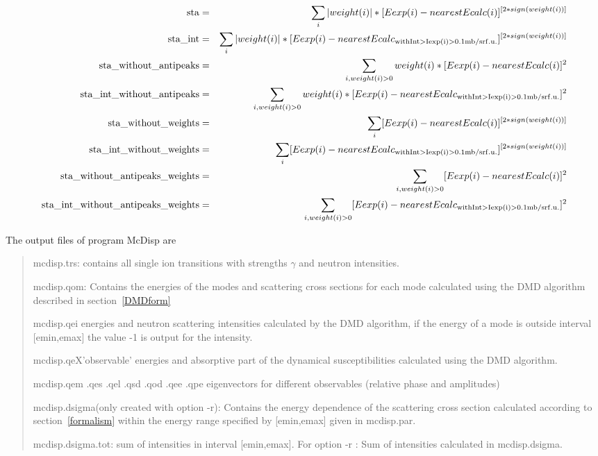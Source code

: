 \begin{eqnarray}
{\rm sta}                              & =& \sum_i |weight(i)|*[Eexp(i) - nearestEcalc(i)]^{[2*sign(weight(i))]}\\
{\rm sta\_int   }                       & = &\sum_i |weight(i)|*[Eexp(i) - nearestEcalc_{\rm with %
Int>Iexp(i)>0.1mb/srf.u.}]^{[2*sign(weight(i))]}\\
{\rm sta\_without\_antipeaks }           & =& \sum_{i, weight(i)>0}  weight(i)*[Eexp(i) - nearestEcalc(i)]^2\\
{\rm sta\_int\_without\_antipeaks }       & =&\sum_{i,weight(i)>0}  weight(i)*[Eexp(i) - nearestEcalc_{\rm with %
Int>Iexp(i)>0.1mb/srf.u.}]^2\\
{\rm sta\_without\_weights }              &=& \sum_i [Eexp(i) - nearestEcalc(i)]^{[2*sign(weight(i))]}\\
{\rm sta\_int\_without\_weights}          & =&\sum_i [Eexp(i) - nearestEcalc_{\rm with %
Int>Iexp(i)>0.1mb/srf.u.}]^{[2*sign(weight(i))]}\\
{\rm sta\_without\_antipeaks\_weights}    & = &\sum_{i, weight(i)>0}[Eexp(i) - nearestEcalc(i)]^2\\
{\rm sta\_int\_without\_antipeaks\_weights}& =& \sum_{i, weight(i)>0} [Eexp(i) - nearestEcalc_{\rm with %
Int>Iexp(i)>0.1mb/srf.u.}]^2\\
\end{eqnarray}



The output files of program {\prg McDisp} are 

\begin{quote}
\item[{\prg mcdisp.trs}:] contains all single ion transitions with strengths $\gamma$ 
and neutron intensities.
\item [{\prg mcdisp.qom}:] Contains the energies of the modes and scattering cross sections  for each mode 
calculated using the DMD algorithm described in section~\ref{DMDform}
\item[{\prg mcdisp.qei}] energies and neutron scattering intensities calculated by the DMD algorithm, if 
        the energy of a mode is outside interval  [emin,emax] the value -1 is output for the intensity.
\item[{\prg mcdisp.qeX'observable'}] energies and absorptive part of the dynamical
        susceptibilities calculated using the DMD algorithm.
\item[{\prg mcdisp.qem .qes .qel .qsd .qod .qee .qpe}] eigenvectors for different observables (relative phase and amplitudes)
\item [{\prg mcdisp.dsigma}(only created with option {\prg -r}):] Contains the energy dependence of the scattering cross %
section
calculated according to section~\ref{formalism} within the energy range specified by [emin,emax] given in {\prg %
mcdisp.par}. 
\item [{\prg mcdisp.dsigma.tot}:] sum of intensities in interval  [emin,emax].  For option {\prg -r} : Sum of intensities calculated in {\prg %
mcdisp.dsigma}.
\end{quote}

